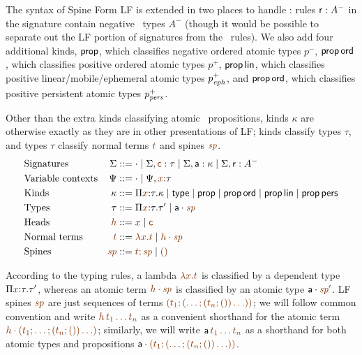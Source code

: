 The syntax of Spine Form LF is extended in two places to handle \sls:
rules ${\sf r} : A^-$ in the signature contain negative \sls~types
$A^-$ (though it would be possible to separate out the LF portion of
signatures from the \sls~rules). We also add four additional kinds,
${\sf prop}$, which classifies negative ordered atomic types $p^-$,
${\sf prop}\,{\sf ord}$, which classifies positive ordered atomic
types $p^+$, ${\sf prop}\,{\sf lin}$, which classifies positive
linear/mobile/ephemeral atomic types $p^+_{\it eph}$, and ${\sf
  prop}\,{\sf ord}$, which classifies positive persistent atomic types
$p^+_{\it pers}$. 

Other than the extra kinds classifying atomic \sls~propositions, kinds
$\kappa$ are otherwise exactly as they are in other presentations of
LF; kinds classify types $\tau$, and types $\tau$ classify normal
terms $\lf{t}$ and spines $\lf{\spi}$.
\begin{align*}
& \mbox{Signatures} & \Sigma & ::= \cdot 
  \mid \Sigma, \lf{\sf c} : \tau
  \mid \Sigma, {\sf a} : \kappa
  \mid \Sigma, {\sf r} : A^-
\\
& \mbox{Variable contexts} & \Psi & ::= \cdot
  \mid \Psi, \lf{x} {:} \tau 
\\
& \mbox{Kinds} & \kappa & ::= \lfpi{x}{\tau}{\kappa} \mid {\sf type}
  \mid {\sf prop}
  \mid {\sf prop}\,{\sf ord}
  \mid {\sf prop}\,{\sf lin}
  \mid {\sf prop}\,{\sf pers}
\\
& \mbox{Types} & \tau & ::= \lfpi{x}{\tau}{\tau'} \mid \lfroot{\sf a}{\spi}
\\
& \mbox{Heads} & \lf{h} & ::= \lf{x} \mid \lf{\sf c}
\\
& \mbox{Normal terms} & \lf{t} & ::= \lf{\lambda x.t}
  \mid \lf{\lfroot{h}{\spi}}
\\
& \mbox{Spines} & \lf{\spi} & ::= \lf{t; \spi} \mid \lf{\lfnil}
\end{align*}

According to the typing rules, a lambda $\lf{\lambda x.t}$ is
classified by a dependent type $\lfpi{x}{\tau}{\tau'}$, whereas an
atomic term $\lf{\lfroot{h}{\spi}}$ is classified by an atomic type
$\lfroot{\sf a}{\spi'}$. LF spines $\lf\spi$ are just sequences of
terms $\lf{(t_1; (\ldots; (t_n;())\ldots))}$; we will follow common
convention and write $\lf{h\,t_1\ldots t_n}$ as a convenient shorthand
for the atomic term $\lf{\lfroot{h}{(t_1; \ldots; (t_n;())\ldots)}}$;
similarly, we will write ${\sf a}\,\lf{t_1\ldots t_n}$ as a shorthand
for both atomic types and propositions $\lfroot{\sf
  a}{(t_1; (\ldots; (t_n;())\ldots))}$.

